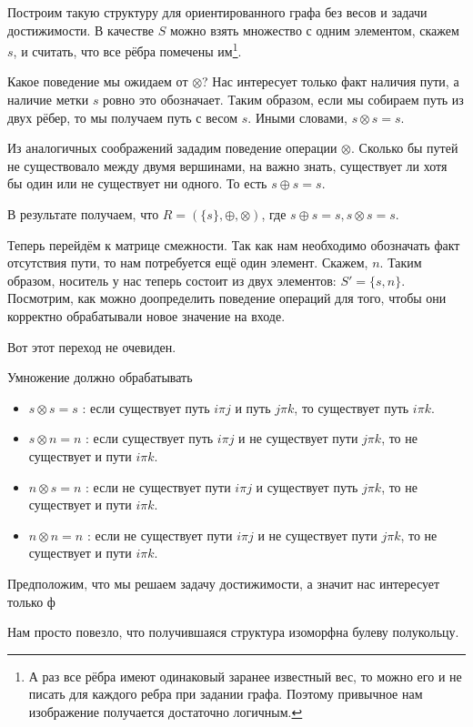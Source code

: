 \begin{example} Построим такую структуру для ориентированного графа без весов и задачи достижимости. В качестве $S$ можно взять множество с одним элементом, скажем $s$, и считать, что все рёбра помечены им\footnote{А раз все рёбра имеют одинаковый заранее известный вес, то можно его и не писать для каждого ребра при задании графа. Поэтому привычное нам изображение получается достаточно логичным.}.  

Какое поведение мы ожидаем от $\otimes$? Нас интересует только факт наличия пути, а наличие метки $s$ ровно это обозначает. Таким образом, если мы собираем путь из двух рёбер, то мы получаем путь с весом $s$. Иными словами, $s \otimes s = s$. 

Из аналогичных соображений зададим поведение операции $\otimes$. Сколько бы путей не существовало между двумя вершинами, на важно знать, существует ли хотя бы один или не существует ни одного. То есть $s \oplus s = s$.

В результате получаем, что $R=(\{s\}, \oplus, \otimes)$, где $s \oplus s = s, s \otimes s = s$.

Теперь перейдём к матрице смежности. Так как нам необходимо обозначать факт отсутствия пути, то нам потребуется ещё один элемент. Скажем, $n$. Таким образом, носитель у нас теперь состоит из двух элементов: $S' = \{s,n\}$. Посмотрим, как можно доопределить поведение операций для того, чтобы они корректно обрабатывали новое значение на входе.

Вот этот переход не очевиден.

Умножение должно обрабатывать 
\begin{itemize}
\item $s \otimes s = s$ : если существует путь $i \pi j$ и путь $j \pi k$, то существует путь $i \pi k$.
\item $s \otimes n = n$ : если существует путь $i \pi j$ и не существует пути $j \pi k$, то не существует и пути $i \pi k$.
\item $n \otimes s = n$ : если не существует пути $i \pi j$ и существует путь $j \pi k$, то не существует и пути $i \pi k$.
\item $n \otimes n = n$ : если не существует пути $i \pi j$ и не существует пути $j \pi k$, то не существует и пути $i \pi k$.
\end{itemize}
Предположим, что мы решаем задачу достижимости, а значит нас интересует только ф

Нам просто повезло, что получившаяся структура изоморфна булеву полукольцу. 

\end{example}

